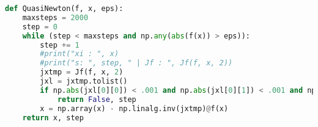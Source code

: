 \begin{lstlisting}[language=Python, style=jupycolors]
def QuasiNewton(f, x, eps):
    maxsteps = 2000
    step = 0
    while (step < maxsteps and np.any(abs(f(x)) > eps)):
        step += 1
        #print("xi : ", x)
        #print("s: ", step, " | Jf : ", Jf(f, x, 2))
        jxtmp = Jf(f, x, 2)
        jxl = jxtmp.tolist()
        if np.abs(jxl[0][0]) < .001 and np.abs(jxl[0][1]) < .001 and np.abs(jxl[1][1]) < .001 and np.abs(jxl[1][0]) < .001 :
            return False, step
        x = np.array(x) - np.linalg.inv(jxtmp)@f(x)
    return x, step
\end{lstlisting}